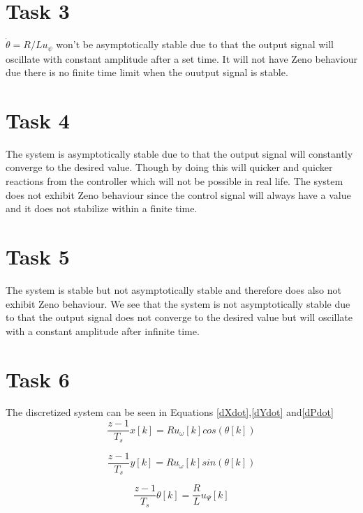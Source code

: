 \documentclass[a4paper,12pt,oneside,onecolumn]{article} %
\begin{document}
\section*{Task 3}

$\dot{\theta} = R/L u_\psi$ won't be asymptotically stable due to that the output signal will oscillate with constant amplitude after a set time. It will not have Zeno behaviour due there is no finite time limit when the ouutput signal is stable. 


\section*{Task 4}

The system is asymptotically stable due to that the output signal will constantly converge to the desired value. Though by doing this will quicker and quicker reactions from the controller which will not be possible in real life. The system does not exhibit Zeno behaviour since the control signal will always have a value and it does not stabilize within a finite time. 


\section*{Task 5}

The system is stable but not asymptotically stable and therefore does also not exhibit Zeno behaviour. We see that the system is not asymptotically stable due to that the output signal does not converge to the desired value but will oscillate with a constant amplitude after infinite time.
\section*{Task 6}

The discretized system can be seen in Equations \eqref{dXdot},\eqref{dYdot} and\eqref{dPdot}
\begin{equation}
\frac{z-1}{T_s} x[k] = Ru_\omega[k] cos(\theta[k])\label{dXdot}
\end{equation}

\begin{equation}
\frac{z-1}{T_s} y[k] = Ru_\omega[k] sin(\theta[k]) \label{dYdot}
\end{equation}

\begin{equation}
\frac{z-1}{T_s} \theta[k] = \frac{R}{L}u_\Psi[k]\label{dPdot}
\end{equation}
\end{document}
